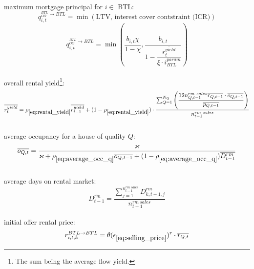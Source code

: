 \documentclass[]{article}
\begin{document}
\\
maximum mortgage principal for $i \in$ BTL:
\begin{equation*}
q^{^{BTL}_{OO}\rightarrow BTL}_{i,t}=\min (\text{LTV, interest cover contstraint (ICR)})
\end{equation*}
\begin{equation} \label{eq:ICR}
q^{^{BTL}_{OO}\rightarrow BTL}_{i,t} = \min\left(\dfrac{b_{i,t}\chi}{1-\chi}, \dfrac{b_{i,t}}{1-\dfrac{\overline{r^{yield}_{t}}}{\xi \cdot i^{param}_{BTL}}}\right)
\end{equation}
\\
overall rental yield\footnote{The sum being the average flow yield.}:
\begin{equation}\label{eq:rental_yield}
	\overline{r^{yield}_{t}} = \rho_{\eqref{eq:rental_yield}}\overline{r^{yield}_{t-1}} +(1-\rho_{\eqref{eq:rental_yield}}) \cdot \frac{\sum_{Q=1}^{N_{Q}}\left({\dfrac{12n^{rm\ sales}_{Q,t-1}\overline{r_{Q, t-1}}\cdot \overline{o_{Q,t-1}}}{\overline{p_{Q, t-1}}}}\right) }{n^{rm\ sales}_{t-1}}
\end{equation}
\\
average occupancy for a house of quality $Q$:
\begin{equation} \label{eq:average_occ_q}
	\overline{o_{Q, t}}= \frac{\varkappa}{\varkappa + \rho_{\eqref{eq:average_occ_q}} \overline{o_{Q, t-1}} + (1-\rho_{\eqref{eq:average_occ_q}}) \overline{D^{rm}_{t-1}}}  
\end{equation}
\\
average days on rental market:
\begin{equation}\label{eq:average_days_rm}
	\overline{D^{rm}_{t-1}} = \frac{\sum_{j=1}^{n^{rm\ sales}_{t-1}}D^{rm}_{k,t-1, j}}{n^{rm\ sales}_{t-1}}
\end{equation}
\\
initial offer rental price:
\begin{equation} \label{eq:rental_price_offer}
r^{BTL \rightarrow BTL}_{i,t,k} = \theta(\epsilon_{\eqref{eq:selling_price}})^{r}  \cdot \overline{{r}_{Q, t}}
\end{equation}
\end{document}
